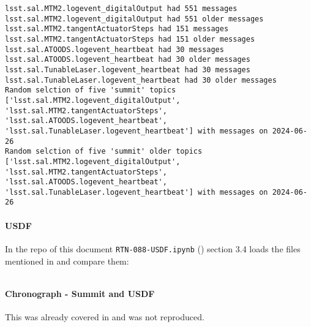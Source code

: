 \begin{lstlisting}
lsst.sal.MTM2.logevent_digitalOutput had 551 messages
lsst.sal.MTM2.logevent_digitalOutput had 551 older messages
lsst.sal.MTM2.tangentActuatorSteps had 151 messages
lsst.sal.MTM2.tangentActuatorSteps had 151 older messages
lsst.sal.ATOODS.logevent_heartbeat had 30 messages
lsst.sal.ATOODS.logevent_heartbeat had 30 older messages
lsst.sal.TunableLaser.logevent_heartbeat had 30 messages
lsst.sal.TunableLaser.logevent_heartbeat had 30 older messages
Random selction of five 'summit' topics ['lsst.sal.MTM2.logevent_digitalOutput', 'lsst.sal.MTM2.tangentActuatorSteps', 'lsst.sal.ATOODS.logevent_heartbeat', 'lsst.sal.TunableLaser.logevent_heartbeat'] with messages on 2024-06-26
Random selction of five 'summit' older topics ['lsst.sal.MTM2.logevent_digitalOutput', 'lsst.sal.MTM2.tangentActuatorSteps', 'lsst.sal.ATOODS.logevent_heartbeat', 'lsst.sal.TunableLaser.logevent_heartbeat'] with messages on 2024-06-26
\end{lstlisting}

\paragraph{USDF}
In the repo of this document \texttt{RTN-088-USDF.ipynb} ()  section 3.4
loads the files mentioned in  and compare them:

\begin{lstlisting}
\end{lstlisting}

\paragraph{Chronograph - Summit and USDF} \label{sec:chrono}
This was already covered in \cite{RTN-053} and was not reproduced.

